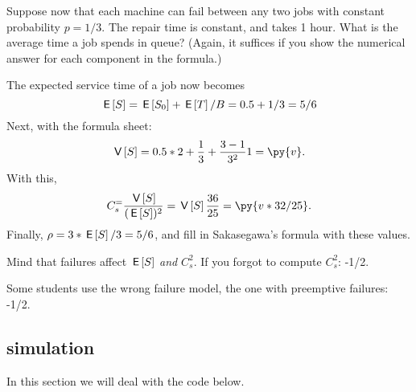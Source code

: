 \begin{exercise}[201807]
Suppose now that each machine can fail between any two jobs with constant probability $p=1/3$. The repair time is constant, and takes 1 hour.  What is the average time a job spends in queue? (Again, it suffices if you show the numerical answer for each component in the formula.)
\begin{solution}
  The expected service time of a job now becomes 
  \begin{equation*}
    \,\mathsf{E}\left[S\right] = \,\mathsf{E}\left[S_0\right] + \,\mathsf{E}\left[T\right]/B = 0.5 + 1/3 = 5/6
  \end{equation*}
Next, with the formula sheet: 
\begin{equation*}
\V{S} = 0.5*2 + \frac 1 3 + \frac{3-1}{3^2} 1 = \py{v}.
\end{equation*}
With this, 
\begin{equation*}
  C_s^ = \frac{\V{S}}{(\E S)^2} = \V{S}\frac{36}{25} = \py{v*32/25}.
\end{equation*}
Finally, $\rho = 3*\,\mathsf{E}\left[S\right] / 3 = 5/6$, and fill in Sakasegawa's formula with these values.

Mind that failures affect $\,\mathsf{E}\left[S\right]$ \emph{and} $C_s^2$. If you forgot to compute $C_s^2$: -1/2.

Some students use the wrong failure model, the one with preemptive failures: -1/2.
\end{solution}
\end{exercise}


\subsection{simulation}
\label{sec:simulation}


In this section we will deal with the code below.


